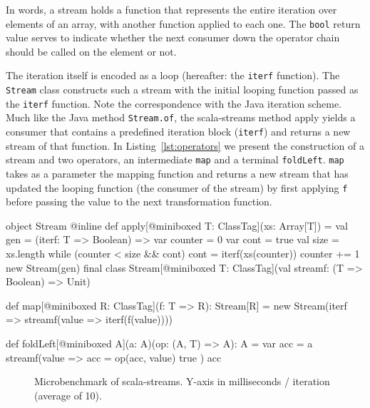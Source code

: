 In words, a stream holds a function that represents the entire iteration over
elements of an array, with another function applied to each one.  The
\verb|bool| return value serves to indicate whether the next consumer down the
operator chain should be called on the element or not.

The iteration itself is encoded as a loop (hereafter: the \verb|iterf|
function). The \verb|Stream| class constructs such a stream with the initial
looping function passed as the \verb|iterf| function. Note the correspondence
with the Java iteration scheme. Much like the Java method \verb|Stream.of|, the
scala-streams method apply yields a consumer that contains a predefined
iteration block (\verb|iterf|) and returns a new stream of that function. In
Listing~\ref{lst:operators} we present the construction of a stream and two
operators, an intermediate \verb|map| and a terminal \verb|foldLeft|. \verb|map|
takes as a parameter the mapping function and returns a new stream that has
updated the looping function (the consumer of the stream) by first applying
\verb|f| before passing the value to the next transformation function.

\begin{lstlisting-nobreak}[language=scala, caption=Creation of a stream \& examples of
  operators., label=lst:operators]
object Stream {
  @inline def apply[@miniboxed T: ClassTag](xs: Array[T]) = {
    val gen = (iterf: T => Boolean) => {
      var counter = 0
      var cont = true
      val size = xs.length
      while (counter < size && cont) {
        cont = iterf(xs(counter))
        counter += 1
      }
    }
  }
  new Stream(gen)
}
final class Stream[@miniboxed T: ClassTag](val streamf: (T => Boolean) => Unit) {
  def map[@miniboxed R: ClassTag](f: T => R): Stream[R] =
    new Stream(iterf => streamf(value => iterf(f(value))))

  def foldLeft[@miniboxed A](a: A)(op: (A, T) => A): A = {
    var acc = a
    streamf(value => {
      acc = op(acc, value)
      true
    })
    acc
  }
}
\end{lstlisting-nobreak}
\begin{figure}
  \centering
  \caption{Microbenchmark of scala-streams. Y-axis in milliseconds / iteration (average of 10).}
  \label{fig:stream_benchmarks}
\end{figure}
